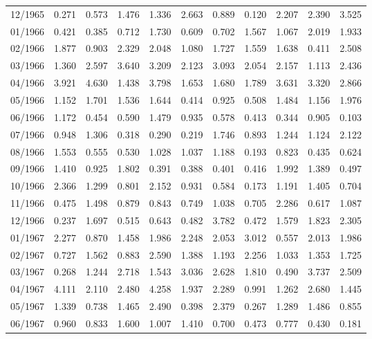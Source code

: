 \begin{tabular}{lrrrrrrrrrr}
12/1965 &  0.271 &  0.573 &  1.476 &  1.336 &  2.663 &  0.889 &  0.120 &  2.207 &  2.390 &  3.525 \\
01/1966 &  0.421 &  0.385 &  0.712 &  1.730 &  0.609 &  0.702 &  1.567 &  1.067 &  2.019 &  1.933 \\
02/1966 &  1.877 &  0.903 &  2.329 &  2.048 &  1.080 &  1.727 &  1.559 &  1.638 &  0.411 &  2.508 \\
03/1966 &  1.360 &  2.597 &  3.640 &  3.209 &  2.123 &  3.093 &  2.054 &  2.157 &  1.113 &  2.436 \\
04/1966 &  3.921 &  4.630 &  1.438 &  3.798 &  1.653 &  1.680 &  1.789 &  3.631 &  3.320 &  2.866 \\
05/1966 &  1.152 &  1.701 &  1.536 &  1.644 &  0.414 &  0.925 &  0.508 &  1.484 &  1.156 &  1.976 \\
06/1966 &  1.172 &  0.454 &  0.590 &  1.479 &  0.935 &  0.578 &  0.413 &  0.344 &  0.905 &  0.103 \\
07/1966 &  0.948 &  1.306 &  0.318 &  0.290 &  0.219 &  1.746 &  0.893 &  1.244 &  1.124 &  2.122 \\
08/1966 &  1.553 &  0.555 &  0.530 &  1.028 &  1.037 &  1.188 &  0.193 &  0.823 &  0.435 &  0.624 \\
09/1966 &  1.410 &  0.925 &  1.802 &  0.391 &  0.388 &  0.401 &  0.416 &  1.992 &  1.389 &  0.497 \\
10/1966 &  2.366 &  1.299 &  0.801 &  2.152 &  0.931 &  0.584 &  0.173 &  1.191 &  1.405 &  0.704 \\
11/1966 &  0.475 &  1.498 &  0.879 &  0.843 &  0.749 &  1.038 &  0.705 &  2.286 &  0.617 &  1.087 \\
12/1966 &  0.237 &  1.697 &  0.515 &  0.643 &  0.482 &  3.782 &  0.472 &  1.579 &  1.823 &  2.305 \\
01/1967 &  2.277 &  0.870 &  1.458 &  1.986 &  2.248 &  2.053 &  3.012 &  0.557 &  2.013 &  1.986 \\
02/1967 &  0.727 &  1.562 &  0.883 &  2.590 &  1.388 &  1.193 &  2.256 &  1.033 &  1.353 &  1.725 \\
03/1967 &  0.268 &  1.244 &  2.718 &  1.543 &  3.036 &  2.628 &  1.810 &  0.490 &  3.737 &  2.509 \\
04/1967 &  4.111 &  2.110 &  2.480 &  4.258 &  1.937 &  2.289 &  0.991 &  1.262 &  2.680 &  1.445 \\
05/1967 &  1.339 &  0.738 &  1.465 &  2.490 &  0.398 &  2.379 &  0.267 &  1.289 &  1.486 &  0.855 \\
06/1967 &  0.960 &  0.833 &  1.600 &  1.007 &  1.410 &  0.700 &  0.473 &  0.777 &  0.430 &  0.181 \\

\end{tabular}
